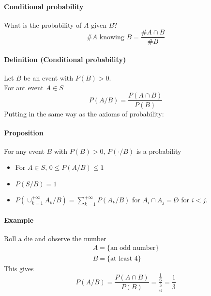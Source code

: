\documentclass[12pt,a4paper,draft]{report}
\author{Frederik Appel Vardinghus-Nielsen}
\begin{document}
\paragraph{Conditional probability}
What is the probability of $A$ given $B$?
\begin{equation}
\# A \text{ knowing } B=\frac{\# A\cap B}{\# B}
\end{equation}
\paragraph{Definition (Conditional probability)}
Let $B$ be an event with $P(B)>0$.\\
For ant event $A\in S$
\begin{equation}
P(A/B)=\frac{P(A\cap B)}{P(B)}
\end{equation}
Putting in the same way as the axioms of probability:
\paragraph{Proposition} For any event $B$ with $P(B)>0$, $P(\cdot / B)$ is a probability
\begin{itemize}
\item For $A\in S$, $0\leq P(A/B)\leq 1$
\item $P(S/B)=1$
\item $P(\cup_{k=1}^{+\infty} A_k/B)=\sum_{k=1}^{+\infty}P(A_k/B)$ for $A_i\cap A_j=Ø$ for $i<j$.
\end{itemize}
\paragraph{Example} Roll a die and observe the number
\begin{align}
A=\{\text{an odd number}\}\\
B=\{\text{at least 4}\}
\end{align}
This gives
\begin{equation}
P(A/B)=\frac{P(A\cap B)}{P(B)}=\frac{\frac{1}{6}}{\frac{3}{6}}=\frac{1}{3}
\end{equation}
\end{document}
